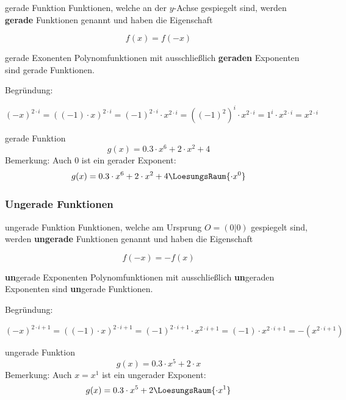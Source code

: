 \begin{definition}{gerade Funktion}{}
  Funktionen, welche an der $y$-Achse gespiegelt sind, werden
  \textbf{gerade} Funktionen genannt und haben die Eigenschaft

  $$f(x) = f(-x)$$
\end{definition}


\begin{gesetz}{gerade Exonenten}{}
  Polynomfunktionen mit ausschließlich \textbf{geraden} Exponenten sind gerade Funktionen.

  Begründung:

  $$(-x)^{2\cdot{}i} = ((-1)\cdot{}x)^{2\cdot{}i} = (-1)^{2\cdot{}i} \cdot{} x^{2\cdot{}i} = \left((-1)^2\right)^i \cdot{} x^{2\cdot{}i} = 1^i\cdot{}x^{2\cdot{}i} = x^{2\cdot{}i}$$
\end{gesetz}

\begin{beispiel}{gerade Funktion}{}
  $$g(x) = 0.3\cdot{}x^6 + 2\cdot{}x^2 + 4$$
  Bemerkung: Auch $0$ ist ein gerader Exponent:
  $$g(x) = 0.3\cdot{}x^6 + 2\cdot{}x^2 + 4\LoesungsRaum{\cdot{}x^0}$$  
\end{beispiel}
\newpage
\subsubsection{Ungerade Funktionen}
\begin{definition}{ungerade Funktion}{}
  Funktionen, welche am Ursprung $O = (0|0)$ gespiegelt sind, werden
  \textbf{ungerade} Funktionen genannt und haben die Eigenschaft

  $$f(-x) = -f(x)$$
\end{definition}




\begin{gesetz}{\textbf{un}gerade Exponenten}{}
  Polynomfunktionen mit ausschließlich \textbf{un}geraden Exponenten sind \textbf{un}gerade Funktionen.

  Begründung:

  $$(-x)^{2\cdot{}i + 1} = ((-1)\cdot{}x)^{2\cdot{}i+1} = (-1)^{2\cdot{}i+1} \cdot{} x^{2\cdot{}i+1} = (-1)\cdot{}x^{2\cdot{}i+1} = -\left(x^{2\cdot{}i+1}\right)$$

\end{gesetz}

\begin{beispiel}{ungerade Funktion}{}
  $$g(x) = 0.3\cdot{}x^5 + 2\cdot{}x $$
  Bemerkung: Auch $x=x^1$ ist ein ungerader Exponent:
  $$g(x) = 0.3\cdot{}x^5 + 2\LoesungsRaum{\cdot{}x^1} $$  
\end{beispiel}
\newpage


